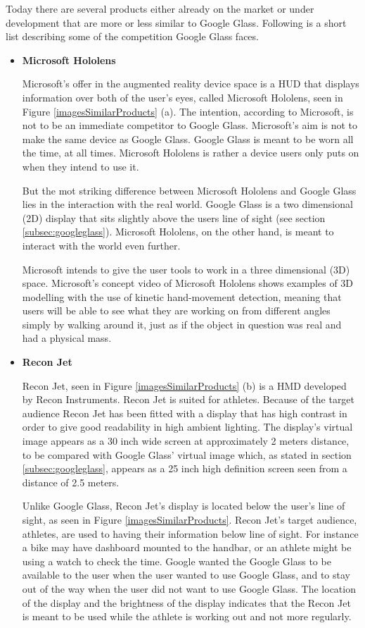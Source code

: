 Today there are several products either already on the market or under development that are more or less similar to Google Glass. Following is a short list describing some of the competition Google Glass faces.

\begin{itemize}
\item \textbf{Microsoft Hololens}\cite{hololens} 

Microsoft's offer in the augmented reality device space is a HUD that displays information over both of the user's eyes, called Microsoft Hololens, seen in Figure \ref{imagesSimilarProducts} (a). The intention, according to Microsoft, is not to be an immediate competitor to Google Glass. Microsoft's aim is not to make the same device as Google Glass. Google Glass is meant to be worn all the time, at all times. Microsoft Hololens is rather a device users only puts on when they intend to use it.

But the mot striking difference between Microsoft Hololens and Google Glass lies in the interaction with the real world. Google Glass is a two dimensional (2D) display that sits slightly above the users line of sight (see section \ref{subsec:googleglass}). Microsoft Hololens, on the other hand, is meant to interact with the world even further.

Microsoft intends to give the user tools to work in a three dimensional (3D) space. Microsoft's concept video\cite{hololensConceptVideo} of Microsoft Hololens shows examples of 3D modelling with the use of kinetic hand-movement detection, meaning that users will be able to see what they are working on from different angles simply by walking around it, just as if the object in question was real and had a physical mass.

\item \textbf{Recon Jet}\cite{reconJet}

Recon Jet, seen in Figure \ref{imagesSimilarProducts} (b) is a HMD developed by Recon Instruments. Recon Jet is suited for athletes. Because of the target audience Recon Jet has been fitted with a display that has high contrast in order to give good readability in high ambient lighting. The display's virtual image appears as  a 30 inch wide screen at approximately 2 meters distance,\cite{reconJetSpecs} to be compared with Google Glass' virtual image which, as stated in section \ref{subsec:googleglass},  appears as a 25 inch high definition screen seen from a distance of 2.5 meters.

Unlike Google Glass, Recon Jet's display is located below the user's line of sight, as seen in Figure \ref{imagesSimilarProducts}. Recon Jet's target audience, athletes, are used to having their information below line of sight. For instance a bike may have dashboard mounted to the handbar, or an athlete might be using a watch to check the time. Google wanted the Google Glass to be available to the user when the user wanted to use Google Glass, and to stay out of the way when the user did not want to use Google Glass. The location of the display and the brightness of the display indicates that the Recon Jet is meant to be used while the athlete is working out and not more regularly.


\end{itemize}
